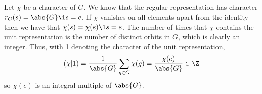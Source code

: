 \documentclass[a4paper, oneside, 10pt]{article}
\numberwithin{Answer}{section}
\numberwithin{Exercise}{section}
\begin{document}
\subsection{}
Let $\chi$ be a character of $G$. 
We know that the regular representation has character $r_G(s) = \abs{G}\1{s=e}$.
If $\chi$ vanishes on all elements apart from the identity then we have that $\chi(s) = \chi(e) \1{s=e}$.
The number of times that $\chi$ contains the unit representation is the number of distinct orbits in $G$,
which is clearly an integer. Thus, with 1 denoting the character of the unit representation,
\[
    (\chi|1) = \frac1{\abs{G}} \sum_{g \in G} \chi(g) = \frac{\chi(e)}{\abs{G}} \in \Z
\]
so $\chi(e)$ is an integral multiple of $\abs{G}$.

\subsection{}

\nocite{*}


\end{document}

